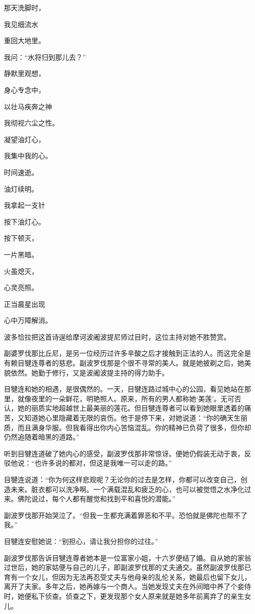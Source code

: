 \documentclass[12pt,twoside,openany]{book}
\begin{document}
那天洗脚时，

我见细流水

重回大地里。

我问：“水将归到那儿去？”

静默里观想，

身心专念中，

以壮马疾奔之神

我彻视六尘之性。

凝望油灯心，

我集中我的心。

时间速逝。

油灯续明。

我拿起一支针

按下油灯心。

按下顿灭，

一片黑暗。

火虽熄灭，

心灵亮照。

正当晨星出现

心中万障解消。

波多恰拉把这首诗逞给摩诃波阇波提尼师过目时，这位主持对她不胜赞赏。

副婆罗伐那比丘尼，是另一位经历过许多辛酸之后才接触到正法的人。而这完全是有赖目犍连尊者的慈悲。副波罗伐那是个很不寻常的美人。就是她披剃之后，她美貌依然。她勤于修行，又是波阇波提主持的得力助手。

目犍连和她的相遇，是很偶然的。一天，目犍连路过城中心的公园，看见她站在那里，就像夜里的一朵鲜花，明艳照人。原来，所有的男人都称她‘美莲’。无可否认，她的丽质实地超越世上最美丽的莲花。但目犍连尊者可以看到她眼里透着的痛苦，又知道她心里隐藏着无限的哀伤。他于是停下来，对她说道：“你的确天生丽质，而且满身华服。但我看得出你内心苦恼混乱。你的精神已负荷了很多，但你却仍然追随着暗黑的道路。”

听到目犍连道破了她内心的感受，副波罗伐那非常惊讶。便她仍假装无动于衷，反驳他说：“也许多说的都对，但这是我唯一可以走的路。”

目犍连说道：“你为何这样悲观呢？无论你的过去是怎样，你都可以改变自己，创造未来。脏衣都可以洗净啊。一个满载混乱和疲乏的心，也可以被觉悟之水净化过来。佛陀说过，每个人都有醒觉和找到平和喜悦的潜能。”

副波罗伐那开始哭泣了。“但我一生都充满着罪恶和不平。恐怕就是佛陀也帮不了我。”

目犍连安慰她说：“别担心，请让我分担你的过往。”

副波罗伐那告诉目犍连尊者她本是一位富家小姐，十六岁便结了婚。自从她的家翁过世后，她的家姑便与自己的儿子，即副波罗伐那的丈夫通交。虽然副波罗伐那已育有一个女儿，但因为无法再忍受丈夫与他母亲的乱伦关系，她最后也留下女儿，离开了夫家。多年之后，她再嫁与一个商人。当她发现丈夫在外间暗中养了个妾侍时，她便私下侦查。侦查之下，更发现那个女人原来就是她多年前离弃了的亲生女儿。
\end{document}

